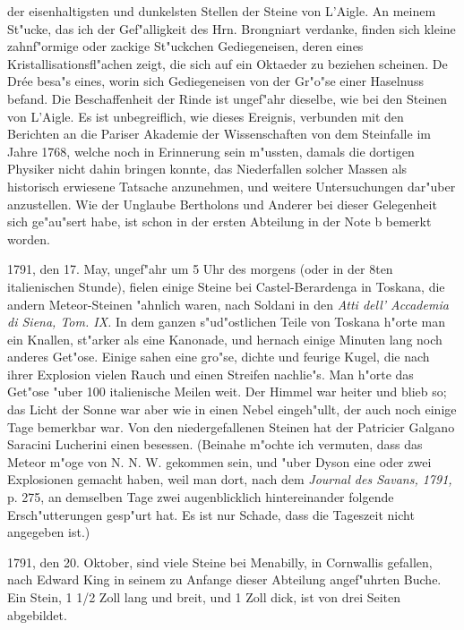 \documentclass[a4paper, 11pt, oneside, polutonikogreek, german]{article}
\begin{document}
der eisenhaltigsten und dunkelsten Stellen der Steine von L'Aigle. An meinem St"ucke, das ich der Gef"alligkeit des Hrn. Brongniart verdanke, finden sich kleine zahnf"ormige oder zackige St"uckchen Gediegeneisen, deren eines Kristallisationsfl"achen zeigt, die sich auf ein Oktaeder zu beziehen scheinen. De Drée besa"s eines, worin sich Gediegeneisen von der Gr"o"se einer Haselnuss befand. Die Beschaffenheit der Rinde ist ungef"ahr dieselbe, wie bei den Steinen von L'Aigle. Es ist unbegreiflich, wie dieses Ereignis, verbunden mit den Berichten an die Pariser Akademie der Wissenschaften von dem Steinfalle im Jahre 1768, welche noch in Erinnerung sein m"ussten, damals die dortigen Physiker nicht dahin bringen konnte, das Niederfallen solcher Massen als historisch erwiesene Tatsache anzunehmen, und weitere Untersuchungen dar"uber anzustellen. Wie der Unglaube Bertholons und Anderer bei dieser Gelegenheit sich ge"au"sert habe, ist schon in der ersten Abteilung in der Note b bemerkt worden.

1791, den 17. May, ungef"ahr um 5 Uhr des morgens (oder in der 8ten italienischen Stunde), fielen einige Steine bei Castel-Berardenga in Toskana, die andern Meteor-Steinen "ahnlich waren, nach Soldani in den \emph{Atti dell' Accademia di Siena, Tom. IX.} In dem ganzen s"ud"ostlichen Teile von Toskana h"orte man ein Knallen, st"arker als eine Kanonade, und hernach einige Minuten lang noch anderes Get"ose. Einige sahen eine gro"se, dichte und feurige Kugel, die nach ihrer Explosion vielen Rauch und einen Streifen nachlie"s. Man h"orte das Get"ose "uber 100 italienische Meilen weit. Der Himmel war heiter und blieb so; das Licht der Sonne war aber wie in einen Nebel eingeh"ullt, der auch noch einige Tage bemerkbar war. Von den niedergefallenen Steinen hat der Patricier Galgano Saracini Lucherini einen besessen. (Beinahe m"ochte ich vermuten, dass das Meteor m"oge von N. N. W. gekommen sein, und "uber Dyson eine oder zwei Explosionen gemacht haben, weil man dort, nach dem \emph{Journal des Savans, 1791,} p. 275, an demselben Tage zwei augenblicklich hintereinander folgende Ersch"utterungen gesp"urt hat. Es ist nur Schade, dass die Tageszeit nicht angegeben ist.)

1791, den 20. Oktober, sind viele Steine bei Menabilly, in Cornwallis gefallen, nach Edward King in seinem zu Anfange dieser Abteilung angef"uhrten Buche. Ein Stein, 1 1/2 Zoll lang und breit, und 1 Zoll dick, ist von drei Seiten abgebildet.
\end{document}
